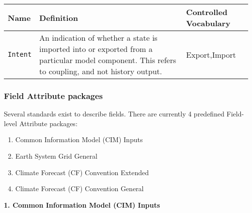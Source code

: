 \begin{tabular}{|p{5cm}|p{5cm}|p{4cm}|}
    \hline\hline
    {\bf Name } & {\bf Definition} & {\bf Controlled Vocabulary} \\
    \hline\hline
    {\tt Intent} & An indication of whether a state is imported into or exported from a particular model component. This refers to coupling, and not history output. & Export,Import \\
    \hline\hline
\end{tabular}

\vspace{.20in}

\subsubsection{Field Attribute packages}
\label{FieldAttributePackages}

Several standards exist to describe fields. There are currently 4 predefined Field-level Attribute packages:

\begin{enumerate}
    \item Common Information Model (CIM) Inputs
    \item Earth System Grid General
    \item Climate Forecast (CF) Convention Extended
    \item Climate Forecast (CF) Convention General
\end{enumerate}

\vspace{.20in}

{\bf 1. Common Information Model (CIM) Inputs}

